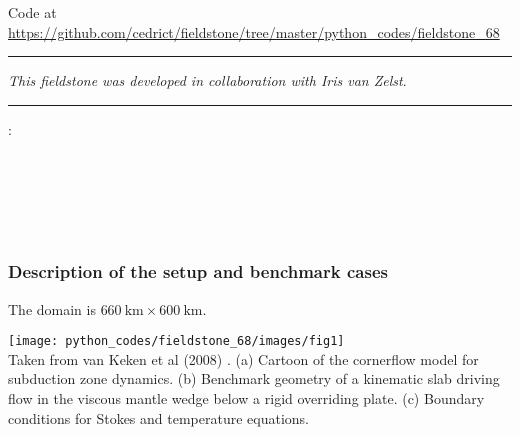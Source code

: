 

\begin{center}
Code at \url{https://github.com/cedrict/fieldstone/tree/master/python_codes/fieldstone_68}
\end{center}

\par\noindent\rule{\textwidth}{0.4pt}

{\sl This fieldstone was developed in collaboration with Iris van Zelst}. 

\par\noindent\rule{\textwidth}{0.4pt}



\Literature: \\
\textcite{vack08}\\
\textcite{syva10}\\
\textcite{vakn12}\\
\textcite{vaws19}\\
\textcite{enma21}\\
\textcite{gadm22}

\subsubsection*{Description of the setup and benchmark cases}


The domain is $660~\si{\km} \times 600~\si{\km}$. 

\begin{center}
\texttt{[image: python\_codes/fieldstone\_68/images/fig1]}\\
{\captionfont Taken from van Keken et al (2008) \cite{vack08}.
(a) Cartoon of the cornerflow model for subduction zone dynamics. 
(b) Benchmark geometry of a kinematic slab driving flow in the viscous
mantle wedge below a rigid overriding plate. 
(c) Boundary conditions for Stokes and temperature equations.}
\end{center}


